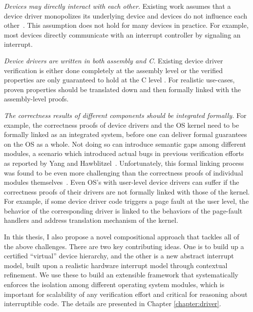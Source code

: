 {\em Devices may directly interact with each other.} Existing work
assumes that a device driver monopolizes its underlying device and
devices do not influence each other~\cite{Alkassar:VSTTE08-225}. This
assumption does not hold for many devices in practice. For example,
most devices directly communicate with an interrupt controller by
signaling an interrupt.

{\em Device drivers are written in both assembly and C.}  Existing
device driver verification is either done completely at the assembly
level \cite{Alkassar:VSTTE08-225,duan2013} or the verified properties
are only guaranteed to hold at the C level \cite{Ryzhyk_09,Ryzhyk14}.
For realistic use-cases, proven properties should be 
translated down and then formally linked with
the assembly-level proofs.

%
{\em The correctness results of different components should be
integrated formally.} For example, the correctness proofs of device
drivers and the OS kernel
need to be formally linked as an integrated system,
before one can deliver formal guarantees on the OS as a whole. Not
doing so can introduce semantic gaps among different modules,
a scenario which introduced actual bugs in previous verification
efforts as reported by Yang and Hawblitzel~\cite{hawblitzel10}. Unfortunately,
this formal linking process was found to be even more challenging than
the correctness proofs of individual modules
themselves~\cite{Alkassar:VSTTE08-225}. Even OS's with user-level
device drivers can suffer if the correctness proofs of their drivers are not
formally linked with those of the kernel. For example,
if some device driver code triggers a page fault at the user level,
the behavior of the corresponding driver is linked to the behaviors of
the page-fault handlers and address translation mechanism of the kernel.

In this thesis, I also propose a novel compositional approach that tackles
all of the above challenges. There are two key contributing ideas.
One is to build up a certified ``virtual'' device hierarchy, and
the other is a new abstract interrupt model, built upon a realistic
hardware interrupt model through contextual refinement. We use these
to build an extensible framework that systematically enforces the
isolation among different operating system modules, which is important
for scalability of any verification effort and critical for reasoning
about interruptible code. The details are presented in Chapter \ref{chapter:driver}.

